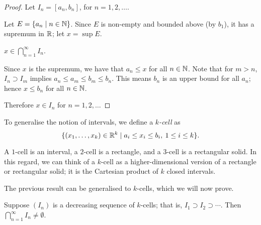 \begin{figure}[H]
\centering
{}
\end{figure}

\begin{proof}
Let $I_n=[a_n,b_n]$, for $n=1,2,\dots$. 

Let $E=\{a_n\mid n\in\mathbb N\}$. Since $E$ is non-empty and bounded above (by $b_1$), it has a supremum in $\mathbb R$; let $x=\sup E$.
\begin{claim}
$\displaystyle x\in\bigcap_{n=1}^{\infty}I_n$.
\end{claim}
Since $x$ is the supremum, we have that $a_n\le x$ for all $n\in\mathbb N$. Note that for $m>n$, $I_n\supset I_m$ implies $a_n\le a_m\le b_m\le b_n$. This means $b_n$ is an upper bound for all $a_n$; hence $x\le b_n$ for all $n\in\mathbb N$.

Therefore $x\in I_n$ for $n=1,2,\dots$
\end{proof}

To generalise the notion of intervals, we define a \emph{$k$-cell} as
\[\{(x_1,\dots,x_k)\in\mathbb R^k\mid a_i\le x_i\le b_i,\:1\le i\le k\}.\]

\begin{example}
A $1$-cell is an interval, a $2$-cell is a rectangle, and a $3$-cell is a rectangular solid. In this regard, we can think of a $k$-cell as a higher-dimensional version of a rectangle or rectangular solid; it is the Cartesian product of $k$ closed intervals.
\end{example}

The previous result can be generalised to $k$-cells, which we will now prove.

\begin{proposition}\label{prop:nested-interval-k-cell}
Suppose $(I_n)$ is a decreasing sequence of $k$-cells; that is, $I_1\supset I_2\supset\cdots$. Then $\bigcap_{n=1}^{\infty}I_n\neq\emptyset$.
\end{proposition}

